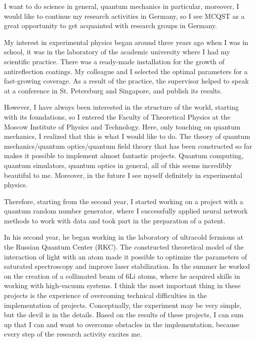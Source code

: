 
I want to do science in general, quantum mechanics in particular, moreover, I would like to continue my research activities in Germany, so I see MCQST as a great opportunity to get acquainted with research groups in Germany.


My interest in experimental physics began around three years ago when I
was in school, it was in the laboratory of the academic university where I had my scientific practice. There was a ready-made installation for the growth of antireflection coatings. My colleague and I selected the optimal parameters for a fast-growing coverage. As a result of the practice, the supervisor helped to speak at a conference in St. Petersburg and Singapore, and publish its results.


However, I have always been interested in the structure of the world, starting with its foundations, so I entered the Faculty of Theoretical Physics at the Moscow Institute of Physics and Technology. Here, only touching on quantum mechanics, I realized that this is what I would like to do. The theory of quantum mechanics/quantum optics/quantum field theory that has been constructed so far makes it possible to implement almost fantastic projects.
Quantum computing, quantum simulators, quantum optics in general, all of this seems incredibly beautiful to me. Moreover, in the future I see myself definitely in experimental physics.


Therefore, starting from the second year, I started working on a project with a quantum random number generator, where I successfully applied neural network methods to work with data and took part in the preparation of a patent.


In his second year, he began working in the laboratory of ultracold fermions at the Russian Quantum Center (RKC). The constructed theoretical model of the interaction of light with an atom made it possible to optimize the parameters of saturated spectroscopy and improve laser stabilization. In the summer he worked on the creation of a collimated beam of 6Li atoms, where he acquired skills in working with high-vacuum systems. I think the most important thing in these projects is the experience of overcoming technical difficulties in the implementation of projects. Conceptually, the experiment may be very simple, but the devil is in the details. Based on the results of these projects, I can sum up that I can and want to overcome obstacles in the implementation, because every step of the research activity excites me.


